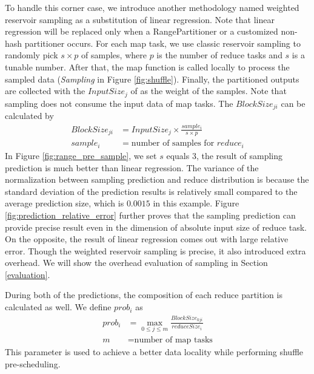 \ifrevision
\reversemarginpar
{}
\fi
To handle this corner case, we introduce another methodology named weighted reservoir sampling as a substitution of linear regression. 
Note that linear regression will be replaced only when a RangePartitioner or a customized non-hash partitioner occurs. 
For each map task, we use classic reservoir sampling to randomly pick $s \times p$ of samples, where $p$ is the number of reduce tasks and $s$ is a tunable number. 
After that, the map function is called locally to process the sampled data (\textit{Sampling} in Figure \ref{fig:shuffle}). 
Finally, the partitioned outputs are collected with the $InputSize_j$ of as the weight of the samples.
Note that sampling does not consume the input data of map tasks. 
The $BlockSize_{ji}$ can be calculated by
\begin{equation}
\label{equationsample}
\begin{aligned}
	BlockSize_{ji} &= {{InputSize_j \times \frac{sample_i}{s \times p}}} \\
	sample_i &= \text{number of samples for $reduce_i$}
\end{aligned}
\end{equation}
In Figure \ref{fig:range_pre_sample}, we set $s$ equals $3$, the result of sampling prediction is much better than linear regression. 
The variance of the normalization between sampling prediction and reduce distribution is because the standard deviation of the prediction results is relatively small compared to the average prediction size, which is $0.0015$ in this example. 
Figure \ref{fig:prediction_relative_error} further proves that the sampling prediction can provide precise result even in the dimension of absolute input size of reduce task. 
On the opposite, the result of linear regression comes out with large relative error. 
Though the weighted reservoir sampling is precise, it also introduced extra overhead. 
We will show the overhead evaluation of sampling in Section \ref{evaluation}.

During both of the predictions, the composition of each reduce partition is calculated as well. We define $prob_i$ as
\begin{equation}
\label{equationprob}
\begin{aligned}
	prob_i &= \max_{0 \leq j \leq m} \frac{BlockSize_{kji}}{reduceSize_i} \\
    m &= \text{number of map tasks}
\end{aligned}
\end{equation}
This parameter is used to achieve a better data locality while performing shuffle pre-scheduling. 

